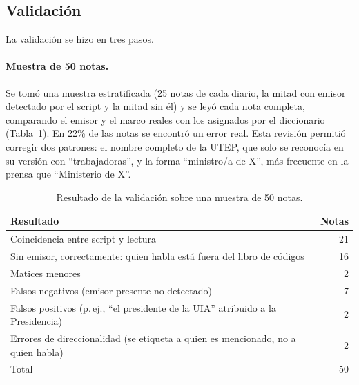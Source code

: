 \documentclass[11pt,a4paper]{article}
\begin{document}
\subsection{Validación}
\label{sec:validacion}

La validación se hizo en tres pasos.

\paragraph{Muestra de 50 notas.} Se tomó una muestra estratificada (25 notas de cada diario, la mitad con emisor detectado por el script y la mitad sin él) y se leyó cada nota completa, comparando el emisor y el marco reales con los asignados por el diccionario (Tabla~\ref{tab:muestra}). En 22\% de las notas se encontró un error real. Esta revisión permitió corregir dos patrones: el nombre completo de la UTEP, que solo se reconocía en su versión con \enquote{trabajadoras}, y la forma \enquote{ministro/a de X}, más frecuente en la prensa que \enquote{Ministerio de X}.

\begin{table}[h]
\centering\small
\caption{Resultado de la validación sobre una muestra de 50 notas.}
\label{tab:muestra}
\begin{tabular}{lr}
\toprule
\textbf{Resultado} & \textbf{Notas} \\
\midrule
Coincidencia entre script y lectura & 21 \\
Sin emisor, correctamente: quien habla está fuera del libro de códigos & 16 \\
Matices menores & 2 \\
Falsos negativos (emisor presente no detectado) & 7 \\
Falsos positivos (p.\,ej., \enquote{el presidente de la UIA} atribuido a la Presidencia) & 2 \\
Errores de direccionalidad (se etiqueta a quien es mencionado, no a quien habla) & 2 \\
\midrule
Total & 50 \\
\bottomrule
\end{tabular}
\end{table}
\end{document}
